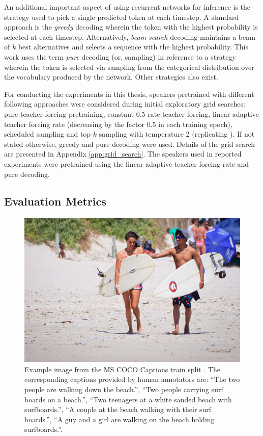An additional important aspect of using recurrent networks for inference is the strategy used to pick a single predicted token at each timestep. A standard approach is the \textit{greedy} decoding wherein the token with the highest probability is selected at each timestep. Alternatively, \textit{beam search} decoding maintains a beam of $k$ best alternatives and selects a sequence with the highest probability. This work uses the term \textit{pure} decoding (or, sampling) in reference to a strategy wherein the token is selected via sampling from the categorical distribution over the vocabulary produced by the network. Other strategies also exist. 

For conducting the experiments in this thesis, speakers pretrained with different following approaches were considered during initial exploratory grid searches: pure teacher forcing pretraining, constant 0.5 rate teacher forcing, linear adaptive teacher forcing rate (decreasing by the factor 0.5 in each training epoch), scheduled sampling and top-$k$ sampling with temperature 2 (replicating \cite{lazaridou2020multi}). If not stated otherwise, greedy and pure decoding were used. Details of the grid search are presented in Appendix \ref{app:grid_search}. The speakers used in reported experiments were pretrained using the linear adaptive teacher forcing rate and pure decoding. 

\subsection{Evaluation Metrics}
\label{image_cap_metrics}

\begin{figure}
	\centering
	\includegraphics[width=0.7\linewidth]{images/COCO_train2014_example.jpg}
	\caption{Example image from the MS COCO Captions train split \parencite{chen2015microsoft}. The corresponding captions provided by human annotators are: ``The two people are walking down the beach.'', ``Two people carrying surf boards on a beach.'', ``Two teenagers at a white sanded beach with surfboards.'', ``A couple at the beach walking with their surf boards.'', ``A guy and a girl are walking on the beach holding surfboards.''. }
	\label{fig:coco_example}
\end{figure}

